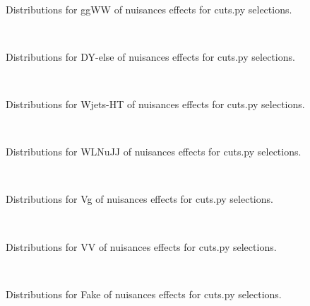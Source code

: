 \begin{figure}[htbp]  
\centering 
\\ 
\caption{ 
   Distributions for ggWW of nuisances effects for cuts.py selections.
} 
\label{fig:ggWW_cuts.py} 
\end{figure} 




\begin{figure}[htbp]  
\centering 
\\ 
\caption{ 
   Distributions for DY-else of nuisances effects for cuts.py selections.
} 
\label{fig:DY_else_cuts.py} 
\end{figure} 




\begin{figure}[htbp]  
\centering 
\\ 
\caption{ 
   Distributions for Wjets-HT of nuisances effects for cuts.py selections.
} 
\label{fig:Wjets_HT_cuts.py} 
\end{figure} 




\begin{figure}[htbp]  
\centering 
\\ 
\caption{ 
   Distributions for WLNuJJ of nuisances effects for cuts.py selections.
} 
\label{fig:WLNuJJ_cuts.py} 
\end{figure} 




\begin{figure}[htbp]  
\centering 
\\ 
\caption{ 
   Distributions for Vg of nuisances effects for cuts.py selections.
} 
\label{fig:Vg_cuts.py} 
\end{figure} 




\begin{figure}[htbp]  
\centering 
\\ 
\caption{ 
   Distributions for VV of nuisances effects for cuts.py selections.
} 
\label{fig:VV_cuts.py} 
\end{figure} 




\begin{figure}[htbp]  
\centering 
\\ 
\caption{ 
   Distributions for Fake of nuisances effects for cuts.py selections.
} 
\label{fig:Fake_cuts.py} 
\end{figure} 




